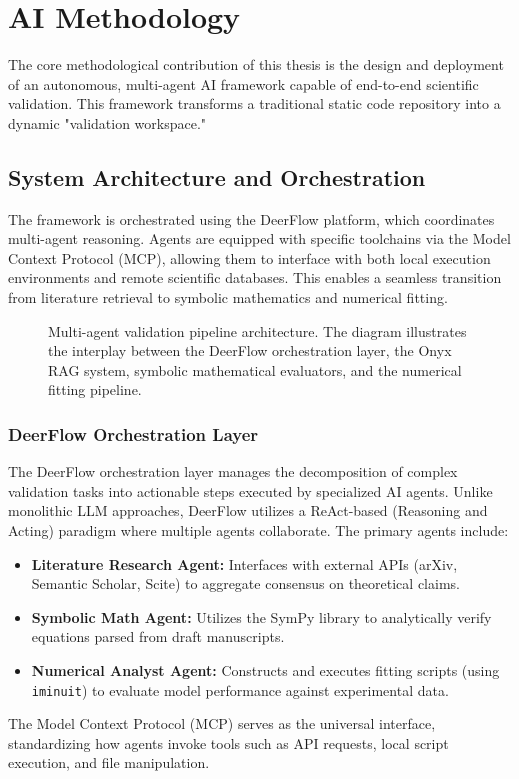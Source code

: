 \chapter{AI Methodology}
\label{ch:ai_methodology}

The core methodological contribution of this thesis is the design and deployment of an autonomous, multi-agent AI framework capable of end-to-end scientific validation. This framework transforms a traditional static code repository into a dynamic "validation workspace."

\section{System Architecture and Orchestration}
The framework is orchestrated using the DeerFlow platform, which coordinates multi-agent reasoning. Agents are equipped with specific toolchains via the Model Context Protocol (MCP), allowing them to interface with both local execution environments and remote scientific databases. This enables a seamless transition from literature retrieval to symbolic mathematics and numerical fitting.

\begin{figure}[h]
\centering
\vspace{5cm} %
\caption{Multi-agent validation pipeline architecture. The diagram illustrates the interplay between the DeerFlow orchestration layer, the Onyx RAG system, symbolic mathematical evaluators, and the numerical fitting pipeline.}
\label{fig:architecture}
\end{figure}

\subsection{DeerFlow Orchestration Layer}
The DeerFlow orchestration layer manages the decomposition of complex validation tasks into actionable steps executed by specialized AI agents. Unlike monolithic LLM approaches, DeerFlow utilizes a ReAct-based (Reasoning and Acting) paradigm where multiple agents collaborate. The primary agents include:
\begin{itemize}
    \item \textbf{Literature Research Agent:} Interfaces with external APIs (arXiv, Semantic Scholar, Scite) to aggregate consensus on theoretical claims.
    \item \textbf{Symbolic Math Agent:} Utilizes the SymPy library to analytically verify equations parsed from draft manuscripts.
    \item \textbf{Numerical Analyst Agent:} Constructs and executes fitting scripts (using \texttt{iminuit}) to evaluate model performance against experimental data.
\end{itemize}
The Model Context Protocol (MCP) serves as the universal interface, standardizing how agents invoke tools such as API requests, local script execution, and file manipulation.

